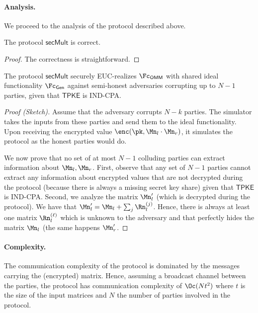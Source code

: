  \paragraph{Analysis.} We proceed to the analysis of the protocol described above.
  
  \begin{lemma}[Correctness]
    The protocol $\mathsf{secMult}$ is correct.
  \end{lemma}{}
  \begin{proof}
  The correctness is straightforward.
  \end{proof}
  
  \begin{lemma}[Security]
    The protocol $\mathsf{secMult}$ securely EUC-realizes $\Fc_{\mathsf{OMM}}$  with shared ideal functionality $\Fc_\mathsf{Gen}$ against semi-honest adversaries  corrupting up to $N-1$ parties, given that $\mathsf{TPKE}$ is IND-CPA.
  \end{lemma}{}
  \begin{proof}[Proof (Sketch)]
    Assume that the adversary corrupts $N-k$ parties. The simulator takes the inputs from these parties and send them to the ideal functionality. Upon receiving the encrypted value $\enc(\pk,\Mn_l\cdot \Mn_r)$, it simulates the protocol as the honest parties would do.
    
    We now prove that no set of at most $N-1$ colluding parties can extract information about $\Mn_l,\Mn_r$. First, observe that any set of $N-1$ parties cannot extract any information about encrypted values that are not decrypted during the protocol (because there is always a missing secret key share) given that $\mathsf{TPKE}$ is IND-CPA. Second, we analyze the matrix  $\Mn_l'$ (which is decrypted during the protocol). We have that $\Mn_l'=\Mn_l+\sum_j \Rn_l^{(j)}$. Hence, there is always at least one matrix $\Rn_l^{(\ell)}$ which is unknown to the adversary and that perfectly hides the matrix $\Mn_l$ (the same happens $\Mn_r'$.
  \end{proof}{}
  
 
\paragraph{Complexity.} The communication complexity of the protocol is dominated by the messages carrying the (encrypted) matrix. Hence, assuming a broadcast channel between the parties, the protocol has communication complexity of $\Oc(Nt^2)$ where $t$ is the size of the input matrices and $N$ the number of parties involved in the protocol.
 
